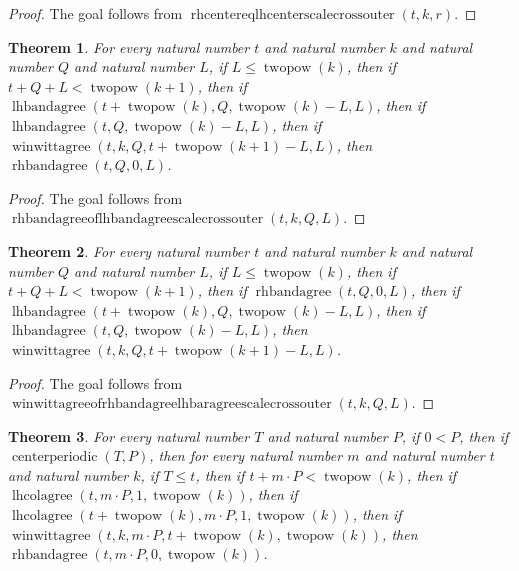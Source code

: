 \documentclass[11pt]{article}
\newtheorem{theorem}{Theorem}[section]
\theoremstyle{definition}
\begin{document}
\begin{proof}
The goal follows from \(\operatorname{rhcentereqlhcenterscalecrossouter}(t, k, r)\).
\end{proof}
\begin{theorem}
\label{ll:paper:rhbandagree-of-lhbandagree-scale-cross-outer}
For every natural number \(t\) and natural number \(k\) and natural number \(Q\) and natural number \(L\), if \(L \le \operatorname{twopow}(k)\), then if \(t + Q + L < \operatorname{twopow}(k + 1)\), then if \(\operatorname{lhbandagree}(t + \operatorname{twopow}(k), Q, \operatorname{twopow}(k) - L, L)\), then if \(\operatorname{lhbandagree}(t, Q, \operatorname{twopow}(k) - L, L)\), then if \(\operatorname{winwittagree}(t, k, Q, t + \operatorname{twopow}(k + 1) - L, L)\), then \(\operatorname{rhbandagree}(t, Q, 0, L)\).
\end{theorem}
\begin{proof}
The goal follows from \(\operatorname{rhbandagreeoflhbandagreescalecrossouter}(t, k, Q, L)\).
\end{proof}
\begin{theorem}
\label{ll:paper:winwittagree-of-rhbandagree-lhbandagree-scale-cross-outer}
For every natural number \(t\) and natural number \(k\) and natural number \(Q\) and natural number \(L\), if \(L \le \operatorname{twopow}(k)\), then if \(t + Q + L < \operatorname{twopow}(k + 1)\), then if \(\operatorname{rhbandagree}(t, Q, 0, L)\), then if \(\operatorname{lhbandagree}(t + \operatorname{twopow}(k), Q, \operatorname{twopow}(k) - L, L)\), then if \(\operatorname{lhbandagree}(t, Q, \operatorname{twopow}(k) - L, L)\), then \(\operatorname{winwittagree}(t, k, Q, t + \operatorname{twopow}(k + 1) - L, L)\).
\end{theorem}
\begin{proof}
The goal follows from \(\operatorname{winwittagreeofrhbandagreelhbaragreescalecrossouter}(t, k, Q, L)\).
\end{proof}
\begin{theorem}
\label{ll:paper:periodic-rhbandagree-of-lhcolagree-one-and-winwittagree-outer}
For every natural number \(T\) and natural number \(P\), if \(0 < P\), then if \(\operatorname{centerperiodic}(T, P)\), then for every natural number \(m\) and natural number \(t\) and natural number \(k\), if \(T \le t\), then if \(t + m \cdot P < \operatorname{twopow}(k)\), then if \(\operatorname{lhcolagree}(t, m \cdot P, 1, \operatorname{twopow}(k))\), then if \(\operatorname{lhcolagree}(t + \operatorname{twopow}(k), m \cdot P, 1, \operatorname{twopow}(k))\), then if \(\operatorname{winwittagree}(t, k, m \cdot P, t + \operatorname{twopow}(k), \operatorname{twopow}(k))\), then \(\operatorname{rhbandagree}(t, m \cdot P, 0, \operatorname{twopow}(k))\).
\end{theorem}
\end{document}
